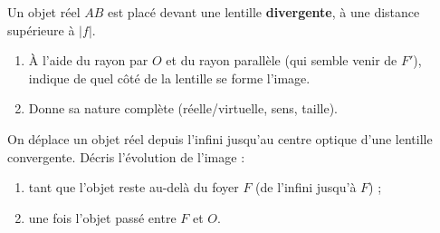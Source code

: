 \documentclass[11pt,a4paper]{article}
\begin{document}
\begin{exo}
Un objet réel $AB$ est placé devant une lentille \textbf{divergente}, à une distance supérieure à
$|f|$.
\begin{enumerate}[label=\alph*)]
  \item À l'aide du rayon par $O$ et du rayon parallèle (qui semble venir de $F'$), indique de quel
        côté de la lentille se forme l'image.
  \item Donne sa nature complète (réelle/virtuelle, sens, taille).
\end{enumerate}
\end{exo}

\begin{exo}
On déplace un objet réel depuis l'infini jusqu'au centre optique d'une lentille convergente. Décris
l'évolution de l'image :
\begin{enumerate}[label=\alph*)]
  \item tant que l'objet reste au-delà du foyer $F$ (de l'infini jusqu'à $F$) ;
  \item une fois l'objet passé entre $F$ et $O$.
\end{enumerate}
\end{exo}
\end{document}
